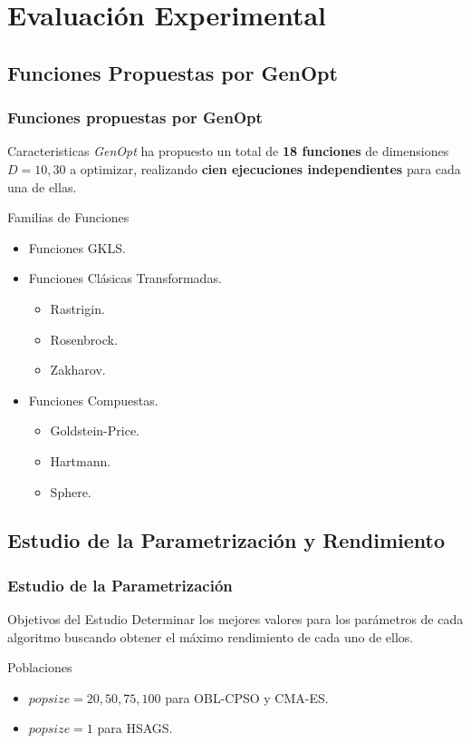 \section{Evaluación Experimental}
\subsection{Funciones Propuestas por GenOpt}
\begin{frame}
\frametitle{Funciones propuestas por GenOpt}
\begin{block}{Caracteristicas}
\textit{GenOpt} ha propuesto un total de \textbf{18 funciones} de dimensiones $D = 10, 30$ a optimizar, realizando \textbf{cien ejecuciones independientes} para cada una de ellas.
\end{block}
\begin{block}{Familias de Funciones}
\begin{itemize}
	\item Funciones GKLS.
	\item Funciones Clásicas Transformadas.
	 \begin{itemize}
    	\item Rastrigin. 
    	\item Rosenbrock. 
    	\item Zakharov. 
    \end{itemize}
	\item Funciones Compuestas.
	 \begin{itemize}
    	  	\item Goldstein-Price.
    	  	\item Hartmann. 
    	  	\item Sphere.
    	  \end{itemize}
\end{itemize}
\end{block}
\end{frame}

\subsection{Estudio de la Parametrización y Rendimiento}

\begin{frame}
\frametitle{Estudio de la Parametrización}
\begin{block}{Objetivos del Estudio}
Determinar los mejores valores para los parámetros de cada algoritmo buscando obtener el máximo rendimiento de cada uno de ellos.
\end{block}
\begin{block}{Poblaciones}
\begin{itemize}
	\item $popsize = 20, 50, 75, 100$ para OBL-CPSO y CMA-ES.
	\item $popsize = 1$ para HSAGS.
	\end{itemize}
\end{block}
\end{frame}


